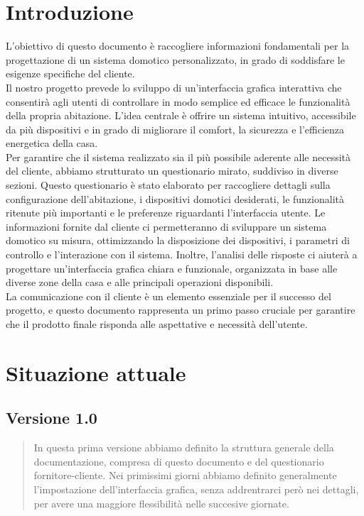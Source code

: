 \documentclass[italian, 12pt, a4paper]{article}
\begin{document}
\section{Introduzione}\label{sec:introduzione}
L’obiettivo di questo documento è raccogliere informazioni fondamentali per la progettazione di un sistema domotico personalizzato, in grado di soddisfare le esigenze specifiche del cliente.\\[1.5mm]Il nostro progetto prevede lo sviluppo di un’interfaccia grafica interattiva che consentirà agli utenti di controllare in modo semplice ed efficace le funzionalità della propria abitazione. L’idea centrale è offrire un sistema intuitivo, accessibile da più dispositivi e in grado di migliorare il comfort, la sicurezza e l’efficienza energetica della casa.\\[1.5mm]
Per garantire che il sistema realizzato sia il più possibile aderente alle necessità del cliente, abbiamo strutturato un questionario mirato, suddiviso in diverse sezioni. Questo questionario è stato elaborato per raccogliere dettagli sulla configurazione dell’abitazione, i dispositivi domotici desiderati, le funzionalità ritenute più importanti e le preferenze riguardanti l’interfaccia utente.
Le informazioni fornite dal cliente ci permetteranno di sviluppare un sistema domotico su misura, ottimizzando la disposizione dei dispositivi, i parametri di controllo e l’interazione con il sistema. Inoltre, l’analisi delle risposte ci aiuterà a progettare un’interfaccia grafica chiara e funzionale, organizzata in base alle diverse zone della casa e alle principali operazioni disponibili.\\[1.5mm]
La comunicazione con il cliente è un elemento essenziale per il successo del progetto, e questo documento rappresenta un primo passo cruciale per garantire che il prodotto finale risponda alle aspettative e necessità dell’utente.
\clearpage
\section{Situazione attuale}\label{sec:situazione}
\subsection{Versione 1.0}
\begin{quote}
In questa prima versione abbiamo definito la struttura generale della documentazione, compresa di questo documento e del questionario fornitore-cliente.  Nei primissimi giorni abbiamo definito generalmente l'impostazione dell'interfaccia grafica, senza addrentrarci però nei dettagli, per avere una maggiore flessibilità nelle succesive giornate.
\end{quote}
\end{document}
